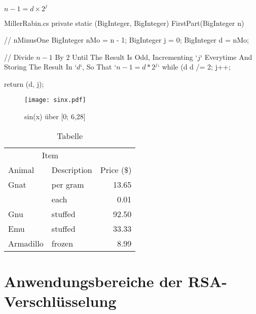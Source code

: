 $n-1=d\times{}2^j$

\begin{cminted}{MillerRabin.cs}
private static (BigInteger, BigInteger) FirstPart(BigInteger n)
{
    // nMinusOne
    BigInteger nMo = n - 1;
    BigInteger j = 0;
    BigInteger d = nMo;

    // Divide $n - 1$ By $2$ Until The Result Is Odd, Incrementing `$j$` Everytime And Storing The Result In `$d$`, So That `$n - 1 = d * 2^j$`
    while (d %
    {
        d /= 2;
        j++;
    }

    return (d, j);
}
\end{cminted}
\newpage

\begin{figure}[ht]
  \texttt{[image: sinx.pdf]}
  \caption{sin(x) über [0; 6,28]}
\end{figure}

\begin{table}
  \center
\begin{tabular}{@{}llr@{}} \toprule
\multicolumn{2}{c}{Item} \\ \cmidrule(r){1-2}
Animal & Description & Price (\$)\\ \midrule
Gnat & per gram & 13.65 \\
& each & 0.01 \\
Gnu & stuffed & 92.50 \\
Emu & stuffed & 33.33 \\
Armadillo & frozen & 8.99 \\ \bottomrule
\end{tabular}
  \caption{Tabelle}
\end{table}

\newpage
\section{Anwendungsbereiche der RSA-Verschlüsselung}
